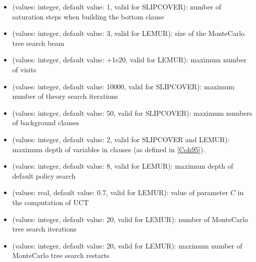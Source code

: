 \documentclass[letterpaper,10pt,english]{sphinxmanual}
\begin{document}
\begin{itemize}
\item {} 
\sphinxAtStartPar
{} (values: integer, default value: 1, valid for SLIPCOVER): number of saturation steps when building the bottom clause

\item {} 
\sphinxAtStartPar
{} (values: integer, default value: 3, valid for LEMUR): size of the Monte\sphinxhyphen{}Carlo tree search beam

\item {} 
\sphinxAtStartPar
{} (values: integer, default value: +1e20, valid for LEMUR): maximum number of visits

\item {} 
\sphinxAtStartPar
{} (values: integer, default value: 10000, valid for SLIPCOVER): maximum number of theory search iterations

\item {} 
\sphinxAtStartPar
{} (values: integer, default value: 50, valid for SLIPCOVER): maximum numbers of background clauses

\item {} 
\sphinxAtStartPar
{} (values: integer, default value: 2, valid for SLIPCOVER and LEMUR): maximum depth of variables in clauses (as defined in {[}\hyperlink{cite.index:id68}{Coh95}{]}).

\item {} 
\sphinxAtStartPar
{} (values: integer, default value: 8, valid for LEMUR): maximum depth of default policy search

\item {} 
\sphinxAtStartPar
{} (values: real, default value: 0.7, valid for LEMUR): value of parameter \(C\) in the computation of UCT

\item {} 
\sphinxAtStartPar
{} (values: integer, default value: 20, valid for LEMUR): number of Monte\sphinxhyphen{}Carlo tree search iterations

\item {} 
\sphinxAtStartPar
{} (values: integer, default value: 20, valid for LEMUR): maximum number of Monte\sphinxhyphen{}Carlo tree search restarts


\end{itemize}
\end{document}
